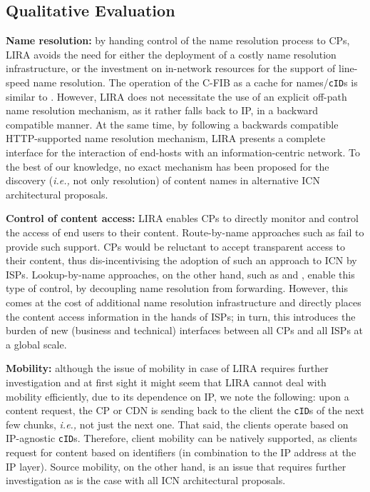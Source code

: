 \documentclass{sig-alternate}
\newcommand{\ie}{{\em i.e.,\/ }}
\begin{document}
\subsection{Qualitative Evaluation}
\label{qualitative-eval}


\textbf{Name resolution:} by handing control of the name resolution process to CPs, LIRA avoids the need for either the deployment of a costly name resolution infrastructure, or the investment on in-network resources for the support of line-speed name resolution. 
The operation of the C-FIB as a cache for names/\texttt{cID}s is similar to \cite{conet-comnet}.
However, LIRA does not necessitate the use of an explicit off-path name resolution mechanism, as it rather falls back to IP, in a backward compatible manner. 
At the same time, by following a backwards compatible HTTP-supported name resolution mechanism, LIRA presents a complete interface for the interaction of end-hosts with an information-centric network. 
To the best of our knowledge, no exact mechanism has been proposed for the discovery (\ie not only resolution) of content names in alternative ICN architectural proposals.


\textbf{Control of content access:}
LIRA enables CPs to directly monitor and control the access of end users to their content. 
Route-by-name approaches such as \cite{ccn} fail to provide such support. 
CPs would be reluctant to accept transparent access to their content, thus dis-incentivising the adoption of such an approach to ICN by ISPs.
Lookup-by-name approaches, on the other hand, such as \cite{netinfnrs} and \cite{pursuitnrs}, enable this type of control, by decoupling name resolution from forwarding. 
However, this comes at the cost of additional name resolution infrastructure and directly places the content access information in the hands of ISPs; in turn, this introduces the burden of new (business and technical) interfaces between all CPs and all ISPs at a global scale.

\textbf{Mobility:} although the issue of mobility in case of LIRA requires further investigation and at first sight it 
might seem that LIRA cannot deal with mobility efficiently, due to its dependence on IP, we note the 
following: upon a content request, the CP or CDN is sending back to the client the \texttt{cID}s of the 
next few chunks, \ie not just the next one. That said, the clients operate based on IP-agnostic \texttt{cID}s. Therefore, client 
mobility can be natively supported, as clients request for content based on identifiers (in combination to the IP address at the IP layer). Source mobility, on the other hand, is an issue that requires further investigation as is the case with all ICN architectural proposals.
\end{document}

